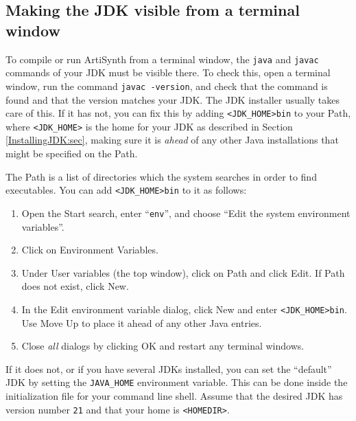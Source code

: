 \subsection{Making the JDK visible from a terminal window}
\label{MakingJDKVisible:sec}

To compile or run ArtiSynth from a terminal window, the {\tt java} and
{\tt javac} commands of your JDK must be visible there. To check this,
open a terminal window, run the command {\tt javac -version}, and check
that the command is found and that the version matches your JDK.
\ifWindows
The JDK installer usually takes care of this. If it has not,
you can fix this by adding
{\tt <JDK\_HOME>\BKS bin} to your Path, where
{\tt <JDK\_HOME>} is the home \directory{} for your JDK
as described in Section \ref{InstallingJDK:sec},
making sure it is {\it ahead} of any other
Java installations that might be specified on the Path.

The Path is a list of directories which the system searches in
order to find executables. You can add {\tt <JDK\_HOME>\BKS bin}
to it as follows:

\begin{enumerate}

\item Open the {\sf Start} search, enter ``{\tt env}'', and choose
{\sf ``Edit the system environment variables''}.

\item Click on {\sf Environment Variables}.

\item Under {\sf User variables} (the top window), click on {\sf Path}
and click {\sf Edit}. If {\sf Path} does not exist, click {\sf New}.

\item In the {\sf Edit environment variable} dialog, click {\sf New}
and enter {\tt<JDK\_HOME>\BKS bin}. Use {\sf Move Up} to place it
ahead of any other Java entries.

\item Close {\it all} dialogs by clicking {\sf OK} and restart
any terminal windows.

\end{enumerate}
\fi
\ifMacOS
If it does not, or if you have several JDKs installed,
you can set the ``default'' JDK by setting the {\tt JAVA\_HOME}
environment variable.  This can be done inside the
initialization file for your command line shell.
Assume that the desired JDK has version number {\tt 21} and
that your home \directory{} is {\tt <HOMEDIR>}.

